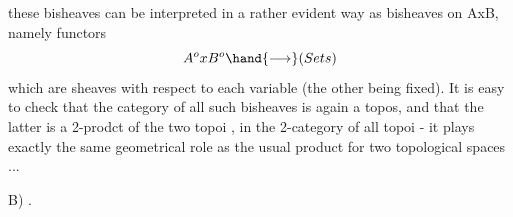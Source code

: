 these bisheaves can be interpreted in a rather evident way as bisheaves
on AxB, namely functors
\[ A^{o}xB^{o} \hand{\longrightarrow} (Sets) \]
which are sheaves with respect to each variable (the other being fixed).
It is easy to check that the category of all such bisheaves is again a
topos, and that the latter is a 2-prodct of the two topoi , in the
2-category of all topoi - it plays exactly the same geometrical role as
the usual product for two topological spaces ...

B) \hand{\uline{\textcolor{black}{Abelianization of a pseudo-topos}}}.

